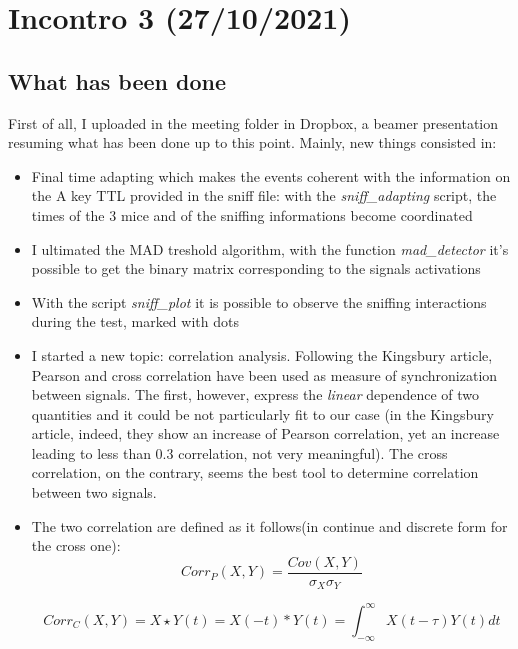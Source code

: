 \documentclass[a4paper]{article}
\begin{document}
	\newpage
	
	\section{Incontro 3 (27/10/2021)}
	
	\subsection{What has been done}
	
	First of all, I uploaded in the meeting folder in Dropbox, a beamer presentation resuming what has been done up to this point.
	Mainly, new things consisted in:
	
	\begin{itemize}
		\item Final time adapting which makes the events coherent with the information on the A key TTL provided in the sniff file: with the \textit{sniff\_adapting} script, the times of the 3 mice and of the sniffing informations become coordinated
		
		\item I ultimated the MAD treshold algorithm, with the function \textit{mad\_detector} it's possible to get the binary matrix corresponding to the signals activations
		
		\item With the script \textit{sniff\_plot} it is possible to observe the sniffing interactions during the test, marked with dots
		
		\item I started a new topic: correlation analysis. Following the Kingsbury article, Pearson and cross correlation have been used as measure of synchronization between signals. The first, however, express the \textit{linear} dependence of two quantities and it could be not particularly fit to our case (in the Kingsbury article, indeed, they show an increase of Pearson correlation, yet an increase leading to less than 0.3 correlation, not very meaningful). The cross correlation, on the contrary, seems the best tool to determine correlation between two signals.
		
		\item The two correlation are defined as it follows(in continue and discrete form for the cross one):
			$$ Corr_P(X,Y) = \frac{Cov(X,Y)}{\sigma_X \sigma_Y} $$
			
			$$  Corr_C(X,Y)  = X \star Y (t) = X(-t)*Y(t) = \int_{-\infty}^{\infty}X(t-\tau)Y(t) dt $$
			

\end{itemize}
\end{document}
